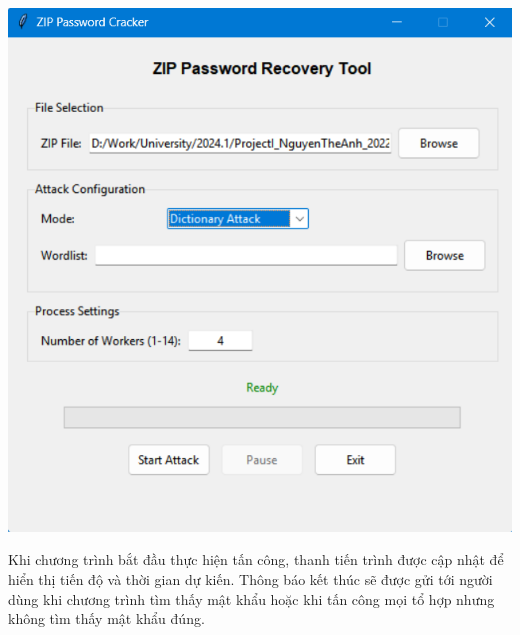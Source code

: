 \documentclass[../DoAn.tex]{subfiles}
\begin{document}
\begin{minipage}[t]{0.45\textwidth}
    \centering
    \includegraphics[width=\textwidth]{Hinhanh/GUIDictionaryAttack.png} %
\end{minipage}

Khi chương trình bắt đầu thực hiện tấn công, thanh tiến trình được cập nhật để hiển thị tiến độ và thời gian dự kiến. Thông báo kết thúc sẽ được gửi tới người dùng khi chương trình tìm thấy mật khẩu hoặc khi tấn công mọi tổ hợp nhưng không tìm thấy mật khẩu đúng.
\end{document}

